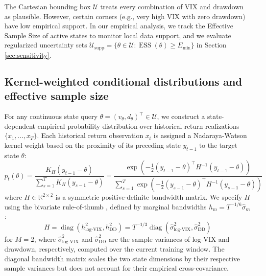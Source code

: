 \documentclass[smallextended]{svjour3}
\begin{document}
\begin{remark}
The Cartesian bounding box $\mathcal{U}$ treats every combination of VIX and drawdown as plausible. However, certain corners (e.g., very high VIX with zero drawdown) have low empirical support. In our empirical analysis, we track the Effective Sample Size of active states to monitor local data support, and we evaluate regularized uncertainty sets $\mathcal{U}_{\text{supp}} = \{\theta \in \mathcal{U} : \operatorname{ESS}(\theta) \ge E_{\min}\}$ in Section \ref{sec:sensitivity}.
\end{remark}






\subsection{Kernel-weighted conditional distributions and effective sample size}
For any continuous state query $\theta = (v_\theta, d_\theta)^\top \in \mathcal{U}$, we construct a state-dependent empirical probability distribution over historical return realizations $\{x_1, \dots, x_T\}$. Each historical return observation $x_t$ is assigned a Nadaraya-Watson kernel weight \cite{nadaraya1964estimating, watson1964smooth} based on the proximity of its preceding state $y_{t-1}$ to the target state $\theta$:
\begin{equation}
    p_t(\theta) = \frac{K_H(y_{t-1} - \theta)}{\sum_{s=1}^{T} K_H(y_{s-1} - \theta)} = \frac{\exp\left(-\frac{1}{2}(y_{t-1} - \theta)^\top H^{-1} (y_{t-1} - \theta)\right)}{\sum_{s=1}^T \exp\left(-\frac{1}{2}(y_{s-1} - \theta)^\top H^{-1} (y_{s-1} - \theta)\right)}
\end{equation}
where $H \in \mathbb{R}^{2 \times 2}$ is a symmetric positive-definite bandwidth matrix. We specify $H$ using the bivariate rule-of-thumb \citep{silverman1986density}, defined by marginal bandwidths $h_m = T^{-1/6}\hat\sigma_m$:
\begin{equation}
    H = \operatorname{diag}\left(h_{\text{log-VIX}}^2, h_{\text{DD}}^2\right) = T^{-1/3} \operatorname{diag}\left(\hat{\sigma}_{\text{log-VIX}}^2, \hat{\sigma}_{\text{DD}}^2\right)
\end{equation}
for $M = 2$, where $\hat{\sigma}^2_{\log\text{-VIX}}$ and $\hat{\sigma}^2_{\text{DD}}$ are the sample variances of log-VIX and drawdown, respectively, computed over the current training window. The diagonal bandwidth matrix scales the two state dimensions by their respective sample variances but does not account for their empirical cross-covariance.
\end{document}
